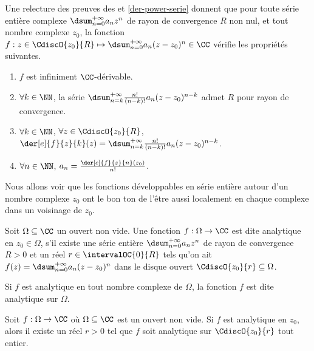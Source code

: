 \begin{remark} \label{der-power-serie-gene}
	Une relecture des preuves des  et \ref{der-power-serie} donnent que pour toute série entière complexe $\dsum_{n=0}^{+\infty} a_n z^n$ de rayon de convergence $R$ non nul,
	et tout nombre complexe $z_0$,
	la fonction $f: z \in \CdiscO{z_0}{R} \mapsto \dsum_{n=0}^{+\infty} a_n (z - z_0)^n \in \CC$ vérifie les propriétés suivantes.
    \begin{enumerate}
    	\item $f$ est infiniment $\CC$-dérivable.

    	\item $\forall k \in \NN$,
		la série $\dsum_{n = k}^{+\infty} \frac{n!}{(n-k)!} a_n (z - z_0)^{n - k}$ admet $R$ pour rayon de convergence.

    	\item $\forall k \in \NN$, $\forall z \in \CdiscO{z_0}{R}$,
		$\der[e]{f}{z}{k}(z) = \dsum_{n = k}^{+\infty} \frac{n!}{(n-k)!} a_n (z - z_0)^{n - k}$.

    	\item $\forall n \in \NN$, $a_n = \frac{\der[e]{f}{z}{n}(z_0)}{n!}$.
    \end{enumerate}
\end{remark}




Nous allons voir que les fonctions développables en série entière autour d'un nombre complexe $z_0$ ont le bon ton de l'être aussi localement en chaque complexe dans un voisinage de $z_0$.


\begin{defi} \label{def-analytic}
    Soit $\Omega \subseteq \CC$ un ouvert non vide.
	Une fonction $f: \Omega \rightarrow \CC$ est dite analytique en $z_0 \in \Omega$, 
	s'il existe
	une série entière $\dsum_{n = 0}^{+\infty} a_n z^n$
	de rayon de convergence $R > 0$
	et
	un réel $r \in \intervalOC{0}{R}$ tels qu'on ait
	$f(z) = \dsum_{n = 0}^{+\infty} a_n (z - z_0)^n$
	dans le disque ouvert $\CdiscO{z_0}{r} \subseteq \Omega$.

	\smallskip
	
	Si $f$ est analytique en tout nombre complexe de $\Omega$,
	la fonction $f$ est dite analytique sur $\Omega$.
\end{defi}




\begin{fact} \label{power-serie-vs-analytic}
    Soit $f: \Omega \rightarrow \CC$ où $\Omega \subseteq \CC$ est un ouvert non vide.
    Si $f$ est analytique en $z_0$,
	alors
	il existe un réel $r > 0$ tel que $f$ soit analytique sur $\CdiscO{z_0}{r}$ tout entier. 
\end{fact}


